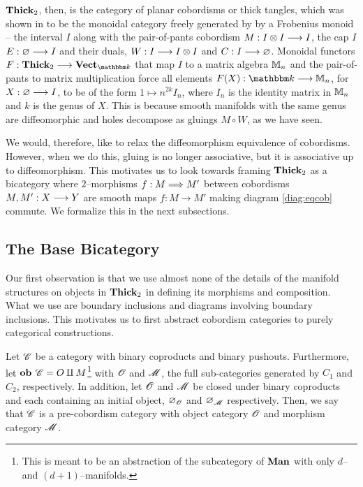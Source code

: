 \documentclass[./Thick_TQFTs_and_Quantum_Information.tex]{subfiles}
\begin{document}
$\textbf{Thick}_2$, then, is the category of planar cobordisms or thick tangles, which
was shown in \cite{NonCommTQFT} to be the monoidal category freely generated by
by a Frobenius monoid -- the interval $I$ along with the pair-of-pants cobordism
$M : I \otimes I \stackrel{}{\longrightarrow} I$, the cap $I$ $E : \varnothing \stackrel{}{\longrightarrow} I$ and their duals,
$W : I \stackrel{}{\longrightarrow} I \otimes I$ and $C : I \stackrel{}{\longrightarrow} \varnothing$. Monoidal functors
$F : \Thick_2 \to \Vect_{\K}$ that map $I$ to a matrix algebra $\mathbb{M}_n$
and the pair-of-pants to matrix multiplication force all elements
$F(X) : \K \to \M_n$, for $X : \varnothing \stackrel{}{\longrightarrow} I$, to be of the form
$1 \mapsto n^{2k}I_n$, where $I_n$ is the identity matrix in $\mathbb{M}_n$ and $k$ is
the genus of $X$. This is because smooth manifolds with the same genus are
diffeomorphic and holes decompose as gluings $M \circ W$, as we have seen.

We would, therefore, like to relax the diffeomorphism equivalence of cobordisms.
However, when we do this, gluing is no longer associative, but it is associative
up to diffeomorphism.  This motivates us to look towards framing $\textbf{Thick}_2$ as a
bicategory where $2$--morphisms $f : M \stackrel{}{\Longrightarrow} M'$ between cobordisms $M,
M' : X \stackrel{}{\longrightarrow} Y$ are smooth maps $f : M \to M'$ making diagram \eqref{diag:eqcob}
commute. We formalize this in the next subsections.

\subsection{The Base Bicategory}

Our first observation is that we use almost none of the details of the manifold
structures on objects in $\textbf{Thick}_2$ in defining its morphisms and composition.
What we use are boundary inclusions and diagrams involving boundary inclusions.
This motivates us to first abstract cobordism categories to purely categorical
constructions.

\begin{defn}
Let $\mathscr{C}$ be a category with binary coproducts and binary pushouts.
Furthermore, let $\textbf{ob } \mathscr{C} = O \amalg M$\footnote{This is meant to be an
abstraction of the subcategory of $\textbf{Man}$ with only $d$-- and
$(d + 1)$--manifolds.} with $\mathscr{O}$ and $\mathscr{M}$, the full
sub-categories generated by $C_1$ and $C_2$, respectively. In addition, let
$\mathscr{O}$ and $\mathscr{M}$ be closed under binary coproducts and each
containing an initial object, $\varnothing_{\mathscr{O}}$ and $\varnothing_{\mathscr{M}}$
respectively. Then, we say that $\mathscr{C}$ is a pre-cobordism category with object
category $\mathscr{O}$ and morphism category $\mathscr{M}$.
\end{defn}
\end{document}
